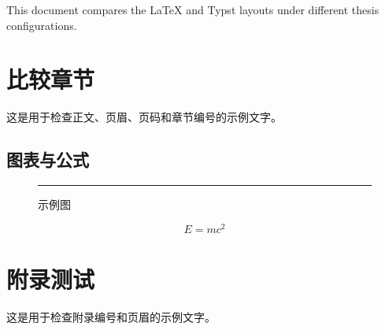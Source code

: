 \documentclass{thuthesis}
\begin{document}
\maketitle

\frontmatter

\begin{abstract}
  本文用于比较 LaTeX 与 Typst 模板在不同论文配置下的版式。
\end{abstract}

\begin{abstract*}
  This document compares the LaTeX and Typst layouts under different
  thesis configurations.
\end{abstract*}

\tableofcontents

\mainmatter

\chapter{比较章节}

这是用于检查正文、页眉、页码和章节编号的示例文字。

\section{图表与公式}

\begin{figure}[htb]
  \centering
  \rule{3cm}{1cm}
  \caption{示例图}
\end{figure}

\begin{equation}
  E = mc^2
\end{equation}

\appendix

\chapter{附录测试}

这是用于检查附录编号和页眉的示例文字。
\end{document}
